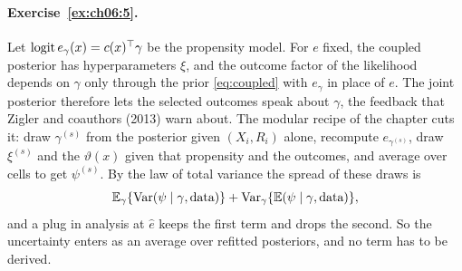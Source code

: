 \paragraph{Exercise~\ref{ex:ch06:5}.} Let $\operatorname{logit} e_\gamma(x) = c(x)^\top\gamma$ be the propensity model. For $e$ fixed, the coupled posterior has hyperparameters $\xi$, and the outcome factor of the likelihood depends on $\gamma$ only through the prior \eqref{eq:coupled} with $e_\gamma$ in place of $e$. The joint posterior therefore lets the selected outcomes speak about $\gamma$, the feedback that Zigler and coauthors (2013) warn about. The modular recipe of the chapter cuts it: draw $\gamma^{(s)}$ from the posterior given $(X_i, R_i)$ alone, recompute $e_{\gamma^{(s)}}$, draw $\xi^{(s)}$ and the $\vartheta(x)$ given that propensity and the outcomes, and average over cells to get $\psi^{(s)}$. By the law of total variance the spread of these draws is
\[
\mathbb{E}_\gamma\{\mathrm{Var}(\psi \mid \gamma, \text{data})\} + \mathrm{Var}_\gamma\{\mathbb{E}(\psi \mid \gamma, \text{data})\},
\]
and a plug in analysis at $\hat e$ keeps the first term and drops the second. So the uncertainty enters as an average over refitted posteriors, and no term has to be derived.

